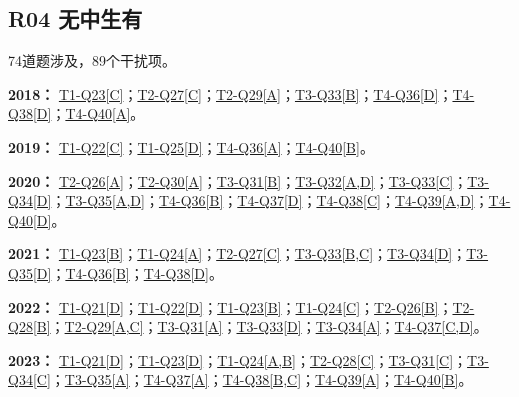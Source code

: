 \documentclass[11pt,a4paper]{article}
\begin{document}
\subsection{R04 无中生有}\label{class-R04}
74道题涉及，89个干扰项。

\noindent\textbf{2018：} \hyperref[idx-2018-T1-Q23]{T1-Q23[C]}；\hyperref[idx-2018-T2-Q27]{T2-Q27[C]}；\hyperref[idx-2018-T2-Q29]{T2-Q29[A]}；\hyperref[idx-2018-T3-Q33]{T3-Q33[B]}；\hyperref[idx-2018-T4-Q36]{T4-Q36[D]}；\hyperref[idx-2018-T4-Q38]{T4-Q38[D]}；\hyperref[idx-2018-T4-Q40]{T4-Q40[A]}。\par\smallskip
\noindent\textbf{2019：} \hyperref[idx-2019-T1-Q22]{T1-Q22[C]}；\hyperref[idx-2019-T1-Q25]{T1-Q25[D]}；\hyperref[idx-2019-T4-Q36]{T4-Q36[A]}；\hyperref[idx-2019-T4-Q40]{T4-Q40[B]}。\par\smallskip
\noindent\textbf{2020：} \hyperref[idx-2020-T2-Q26]{T2-Q26[A]}；\hyperref[idx-2020-T2-Q30]{T2-Q30[A]}；\hyperref[idx-2020-T3-Q31]{T3-Q31[B]}；\hyperref[idx-2020-T3-Q32]{T3-Q32[A,D]}；\hyperref[idx-2020-T3-Q33]{T3-Q33[C]}；\hyperref[idx-2020-T3-Q34]{T3-Q34[D]}；\hyperref[idx-2020-T3-Q35]{T3-Q35[A,D]}；\hyperref[idx-2020-T4-Q36]{T4-Q36[B]}；\hyperref[idx-2020-T4-Q37]{T4-Q37[D]}；\hyperref[idx-2020-T4-Q38]{T4-Q38[C]}；\hyperref[idx-2020-T4-Q39]{T4-Q39[A,D]}；\hyperref[idx-2020-T4-Q40]{T4-Q40[D]}。\par\smallskip
\noindent\textbf{2021：} \hyperref[idx-2021-T1-Q23]{T1-Q23[B]}；\hyperref[idx-2021-T1-Q24]{T1-Q24[A]}；\hyperref[idx-2021-T2-Q27]{T2-Q27[C]}；\hyperref[idx-2021-T3-Q33]{T3-Q33[B,C]}；\hyperref[idx-2021-T3-Q34]{T3-Q34[D]}；\hyperref[idx-2021-T3-Q35]{T3-Q35[D]}；\hyperref[idx-2021-T4-Q36]{T4-Q36[B]}；\hyperref[idx-2021-T4-Q38]{T4-Q38[D]}。\par\smallskip
\noindent\textbf{2022：} \hyperref[idx-2022-T1-Q21]{T1-Q21[D]}；\hyperref[idx-2022-T1-Q22]{T1-Q22[D]}；\hyperref[idx-2022-T1-Q23]{T1-Q23[B]}；\hyperref[idx-2022-T1-Q24]{T1-Q24[C]}；\hyperref[idx-2022-T2-Q26]{T2-Q26[B]}；\hyperref[idx-2022-T2-Q28]{T2-Q28[B]}；\hyperref[idx-2022-T2-Q29]{T2-Q29[A,C]}；\hyperref[idx-2022-T3-Q31]{T3-Q31[A]}；\hyperref[idx-2022-T3-Q33]{T3-Q33[D]}；\hyperref[idx-2022-T3-Q34]{T3-Q34[A]}；\hyperref[idx-2022-T4-Q37]{T4-Q37[C,D]}。\par\smallskip
\noindent\textbf{2023：} \hyperref[idx-2023-T1-Q21]{T1-Q21[D]}；\hyperref[idx-2023-T1-Q23]{T1-Q23[D]}；\hyperref[idx-2023-T1-Q24]{T1-Q24[A,B]}；\hyperref[idx-2023-T2-Q28]{T2-Q28[C]}；\hyperref[idx-2023-T3-Q31]{T3-Q31[C]}；\hyperref[idx-2023-T3-Q34]{T3-Q34[C]}；\hyperref[idx-2023-T3-Q35]{T3-Q35[A]}；\hyperref[idx-2023-T4-Q37]{T4-Q37[A]}；\hyperref[idx-2023-T4-Q38]{T4-Q38[B,C]}；\hyperref[idx-2023-T4-Q39]{T4-Q39[A]}；\hyperref[idx-2023-T4-Q40]{T4-Q40[B]}。\par\smallskip
\end{document}
